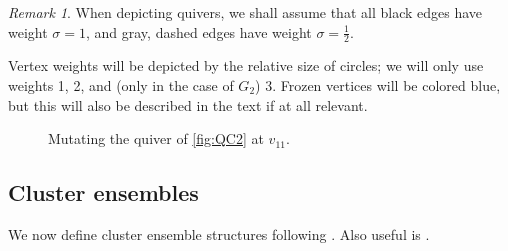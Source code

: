 \documentclass{amsart}
\theoremstyle{plain}
\theoremstyle{definition}
\theoremstyle{remark}
\newtheorem{remark}[theorem]{Remark}
\begin{document}
  \begin{remark}
    When depicting quivers, we shall assume that all black edges have
    weight $\sigma = 1$, and gray, dashed edges have weight $\sigma =
    \frac{1}{2}$.

    Vertex weights will be depicted by the relative size of circles; we
    will only use weights 1, 2, and (only in the case of $G_2$) 3.
    Frozen vertices will be colored blue, but this will also be
    described in the text if at all relevant.

    \begin{figure}[h]
      \centering
      

      \caption{Mutating the quiver of \cref{fig:QC2} at $v_{11}$.
        \label{fig:quiver-mutation-example}
      }
    \end{figure}

  \end{remark}

  \subsection{Cluster ensembles}

  \label{sec:cluster-ensembles}

  We now define cluster ensemble structures following
  \cite{fockgoncharov2003}. Also useful is \cite{ishibashi2018}.
\end{document}
